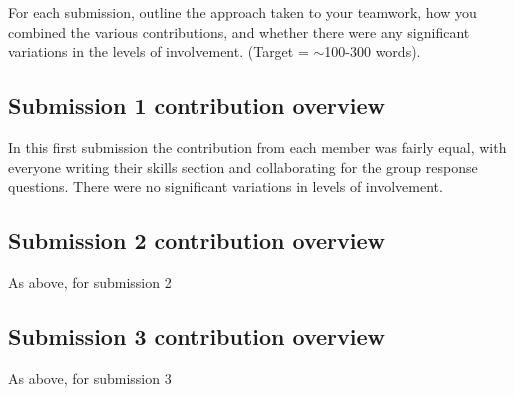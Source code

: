 \documentclass[a4paper, 11pt]{report}
\begin{document}
For each submission, outline the approach taken to your teamwork, how you combined the various contributions, and whether there were any significant variations in the levels of involvement. (Target = $\sim$100-300 words).

\subsection{Submission 1 contribution overview}

In this first submission the contribution from each member was fairly equal, with everyone writing their skills section and collaborating for the group response questions. There were no significant variations in levels of involvement.

\subsection{Submission 2 contribution overview}

As above, for submission 2

\subsection{Submission 3 contribution overview}

As above, for submission 3



\newpage



\end{document}
